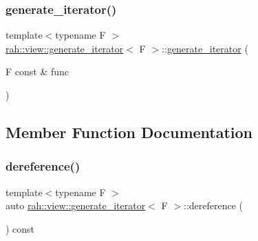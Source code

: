 \mbox{\label{structrah_1_1view_1_1generate__iterator_a407696209d96fe38234970a91d23e35f}} 
\subsubsection{\texorpdfstring{generate\_iterator()}{generate\_iterator()}\hspace{0.1cm}{\footnotesize\ttfamily [2/2]}}
{\footnotesize\ttfamily template$<$typename F $>$ \\
\mbox{\hyperlink{structrah_1_1view_1_1generate__iterator}{rah\+::view\+::generate\+\_\+iterator}}$<$ F $>$\+::\mbox{\hyperlink{structrah_1_1view_1_1generate__iterator}{generate\+\_\+iterator}} (\begin{DoxyParamCaption}\item[{F const \&}]{func }\end{DoxyParamCaption})\hspace{0.3cm}{\ttfamily [inline]}}



\subsection{Member Function Documentation}
\mbox{\label{structrah_1_1view_1_1generate__iterator_ab7b0cf4a8f45cfd67278935bd9a39c13}} 
\subsubsection{\texorpdfstring{dereference()}{dereference()}\hspace{0.1cm}{\footnotesize\ttfamily [1/2]}}
{\footnotesize\ttfamily template$<$typename F $>$ \\
auto \mbox{\hyperlink{structrah_1_1view_1_1generate__iterator}{rah\+::view\+::generate\+\_\+iterator}}$<$ F $>$\+::dereference (\begin{DoxyParamCaption}{ }\end{DoxyParamCaption}) const\hspace{0.3cm}{\ttfamily [inline]}}

